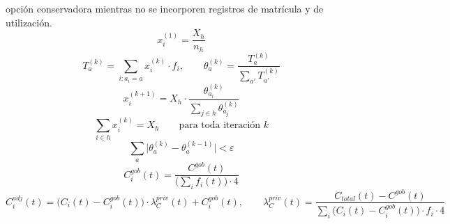 \documentclass[11pt,a4paper]{article}
\begin{document}
opción conservadora mientras no se incorporen registros de matrícula y de utilización.
\begin{equation}
\label{eq:alloc1}
x_i^{(1)} = \frac{X_h}{n_h}
\end{equation}
\begin{equation}
\label{eq:alloc2}
T_a^{(k)} = \sum_{i : a_i = a} x_i^{(k)} \cdot f_i,
\qquad
\theta_a^{(k)} = \frac{T_a^{(k)}}{\sum_{a'} T_{a'}^{(k)}}
\end{equation}
\begin{equation}
\label{eq:alloc3}
x_i^{(k+1)} = X_h \cdot \frac{\theta_{a_i}^{(k)}}{\sum_{j \in h} \theta_{a_j}^{(k)}}
\end{equation}
\begin{equation}
\label{eq:alloccons}
\sum_{i \in h} x_i^{(k)} = X_h \qquad \text{para toda iteración } k
\end{equation}
\begin{equation}
\label{eq:allocconv}
\sum_a \big|\theta_a^{(k)} - \theta_a^{(k-1)}\big| < \varepsilon
\end{equation}
\begin{equation}
\label{eq:cgob}
C^{gob}_i(t) = \frac{C^{gob}(t)}{\big(\sum_i f_i(t)\big)\cdot 4}
\end{equation}
\begin{equation}
\label{eq:cparticion}
C^{adj}_i(t) = \big(C_i(t) - C^{gob}_i(t)\big)\cdot\lambda^{priv}_C(t) + C^{gob}_i(t),
\qquad
\lambda^{priv}_C(t) = \frac{C_{total}(t) - C^{gob}(t)}
{\sum_i \big(C_i(t) - C^{gob}_i(t)\big)\cdot f_i \cdot 4}
\end{equation}
\end{document}
